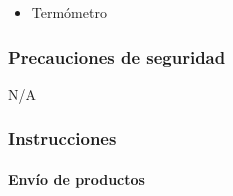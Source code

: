 \begin{itemize}
	\item Termómetro
\end{itemize}

\subsubsection{Precauciones de seguridad}

N/A

\subsubsection{Instrucciones}

\paragraph{Envío de productos}


